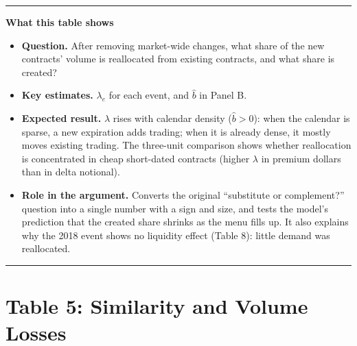 \documentclass[11pt]{article}
\newenvironment{tableshows}
  {\begin{center}\begin{minipage}{0.95\textwidth}\small
   \hrule\vspace{4pt}
   \textbf{What this table shows}\par
   \begin{itemize}[leftmargin=12pt,topsep=4pt,itemsep=4pt,parsep=0pt]}
  {\end{itemize}\vspace{2pt}\hrule\end{minipage}\end{center}}
\begin{document}
\begin{table}[H]
\begin{threeparttable}
\begin{tablenotes}
\end{tablenotes}
\end{threeparttable}
\end{table}

\begin{tableshows}
\item \textbf{Question.} After removing market-wide changes, what share of the new contracts' volume is reallocated from existing contracts, and what share is created?
\item \textbf{Key estimates.} $\lambda_e$ for each event, and $\hat b$ in Panel B.
\item \textbf{Expected result.} $\lambda$ rises with calendar density ($\hat b > 0$): when the calendar is sparse, a new expiration adds trading; when it is already dense, it mostly moves existing trading. The three-unit comparison shows whether reallocation is concentrated in cheap short-dated contracts (higher $\lambda$ in premium dollars than in delta notional).
\item \textbf{Role in the argument.} Converts the original ``substitute or complement?'' question into a single number with a sign and size, and tests the model's prediction that the created share shrinks as the menu fills up. It also explains why the 2018 event shows no liquidity effect (Table 8): little demand was reallocated.
\end{tableshows}

\clearpage
\section*{Table 5: Similarity and Volume Losses}
\end{document}
